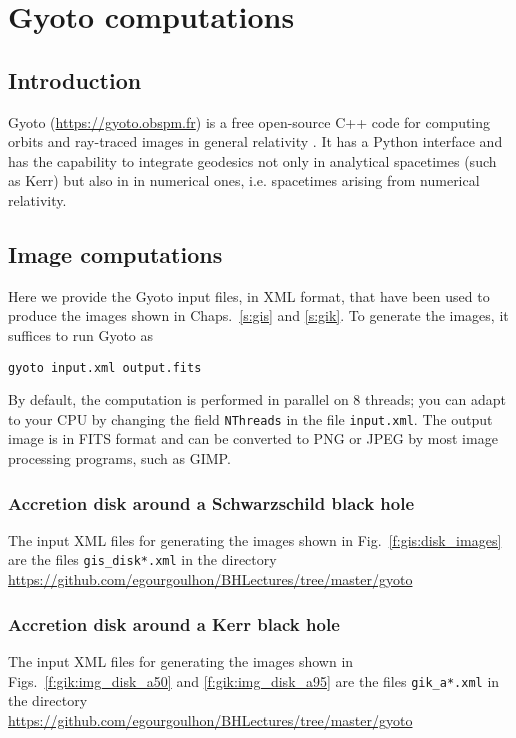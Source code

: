 \chapter{Gyoto computations} \label{s:gyo}

\minitoc

\section{Introduction}


\textsf{Gyoto} (\url{https://gyoto.obspm.fr}) is a free open-source
C++ code for computing orbits and ray-traced images in general relativity
\cite{VincePGP11}.
It has a Python interface and has the capability to integrate geodesics
not only in analytical spacetimes (such as Kerr) but also in
in numerical ones, i.e. spacetimes arising from numerical relativity.


\section{Image computations}

Here we provide the \textsf{Gyoto} input files, in XML format, that have been
used to produce the images shown in Chaps.~\ref{s:gis} and \ref{s:gik}.
To generate the images, it suffices to run \textsf{Gyoto} as
\begin{center}
\verb+gyoto input.xml output.fits+
\end{center}
By default, the computation is performed in parallel on 8 threads; you can
adapt to your CPU by changing the field \texttt{NThreads} in the file
\texttt{input.xml}. The output image is in FITS format and can be converted
to PNG or JPEG by most image processing programs, such as \textsf{GIMP}.

\subsection{Accretion disk around a Schwarzschild black hole} \label{s:gyo:Schwarz}

The input XML files for generating the images shown in Fig.~\ref{f:gis:disk_images}
are the files \verb+gis_disk*.xml+ in the directory\\
\url{https://github.com/egourgoulhon/BHLectures/tree/master/gyoto}


\subsection{Accretion disk around a Kerr black hole} \label{s:gyo:Kerr}

The input XML files for generating the images shown in Figs.~\ref{f:gik:img_disk_a50}
and \ref{f:gik:img_disk_a95}
are the files \verb+gik_a*.xml+ in the directory\\
\url{https://github.com/egourgoulhon/BHLectures/tree/master/gyoto}

